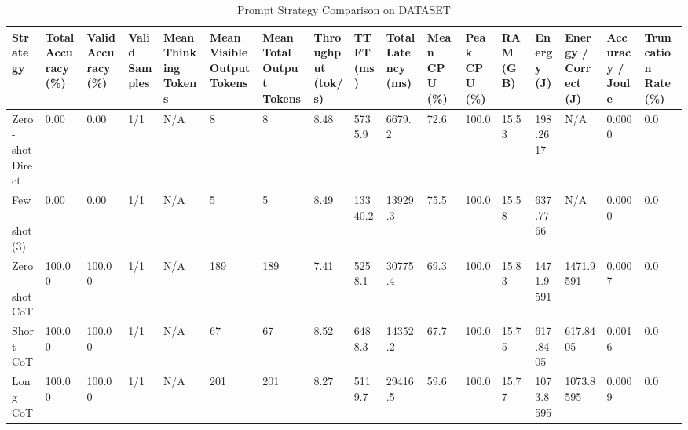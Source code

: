 \begin{table}
\caption{Prompt Strategy Comparison on DATASET}
\label{tab:strategy_comparison}
\begin{tabular}{lllllllllllllllll}
\toprule
Strategy & Total Accuracy (\%) & Valid Accuracy (\%) & Valid Samples & Mean Thinking Tokens & Mean Visible Output Tokens & Mean Total Output Tokens & Throughput (tok/s) & TTFT (ms) & Total Latency (ms) & Mean CPU (\%) & Peak CPU (\%) & RAM (GB) & Energy (J) & Energy / Correct (J) & Accuracy / Joule & Truncation Rate (\%) \\
\midrule
Zero-shot Direct & 0.00 & 0.00 & 1/1 & N/A & 8 & 8 & 8.48 & 5735.9 & 6679.2 & 72.6 & 100.0 & 15.53 & 198.2617 & N/A & 0.0000 & 0.0 \\
Few-shot (3) & 0.00 & 0.00 & 1/1 & N/A & 5 & 5 & 8.49 & 13340.2 & 13929.3 & 75.5 & 100.0 & 15.58 & 637.7766 & N/A & 0.0000 & 0.0 \\
Zero-shot CoT & 100.00 & 100.00 & 1/1 & N/A & 189 & 189 & 7.41 & 5258.1 & 30775.4 & 69.3 & 100.0 & 15.83 & 1471.9591 & 1471.9591 & 0.0007 & 0.0 \\
Short CoT & 100.00 & 100.00 & 1/1 & N/A & 67 & 67 & 8.52 & 6488.3 & 14352.2 & 67.7 & 100.0 & 15.75 & 617.8405 & 617.8405 & 0.0016 & 0.0 \\
Long CoT & 100.00 & 100.00 & 1/1 & N/A & 201 & 201 & 8.27 & 5119.7 & 29416.5 & 59.6 & 100.0 & 15.77 & 1073.8595 & 1073.8595 & 0.0009 & 0.0 \\
\bottomrule
\end{tabular}
\end{table}
